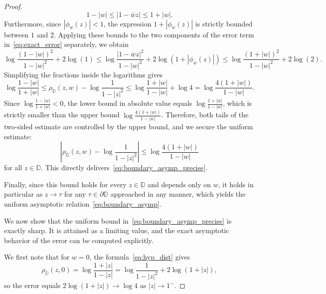 \documentclass[12pt]{amsart}
\numberwithin{equation}{section}
\theoremstyle{plain}
\theoremstyle{definition}
\begin{document}
\begin{proof}
\begin{equation*}
1-|w| \le |1-\bar w z| \le 1+|w|.
\end{equation*}
Furthermore, since $|\phi_w(z)| < 1$, the expression $1+|\phi_w(z)|$ is strictly bounded between $1$ and $2$. Applying these bounds to the two components of the error term in~\eqref{eq:exact_error} separately, we obtain
\begin{equation*}
\log\frac{(1-|w|)^2}{1-|w|^2} + 2\log(1) \le \log\frac{|1-\bar w z|^2}{1-|w|^2} + 2\log(1+|\phi_w(z)|) \le \log\frac{(1+|w|)^2}{1-|w|^2} + 2\log(2).
\end{equation*}
Simplifying the fractions inside the logarithms gives
\begin{equation*}
\log\frac{1-|w|}{1+|w|} \le \rho_{\mathbb{D}}(z,w) - \log\frac{1}{1-|z|^2} \le \log\frac{1+|w|}{1-|w|} + \log 4 = \log\frac{4(1+|w|)}{1-|w|}.
\end{equation*}
Since $\log\frac{1-|w|}{1+|w|} < 0$, the lower bound in absolute value equals $\log\frac{1+|w|}{1-|w|}$, which is strictly smaller than the upper bound $\log\frac{4(1+|w|)}{1-|w|}$. Therefore, both tails of the two-sided estimate are controlled by the upper bound, and we secure the uniform estimate:
\begin{equation*}
\left|\rho_{\mathbb{D}}(z,w) - \log\frac{1}{1-|z|^2}\right| \le \log\frac{4(1+|w|)}{1-|w|}
\end{equation*}
for all $z \in \mathbb{D}$. This directly delivers~\eqref{eq:boundary_asymp_precise}.

Finally, since this bound holds for every $z\in\mathbb{D}$ and depends only on $w$, it holds in particular as $z\to\tau$ for any $\tau\in\partial\mathbb{D}$ approached in any manner, which yields the uniform asymptotic relation~\eqref{eq:boundary_asymp}.


We now show that the uniform bound in~\eqref{eq:boundary_asymp_precise} is exactly sharp. It is attained as a limiting value, and the exact asymptotic behavior of the error can be computed explicitly.

We first note that for $w=0$, the formula~\eqref{eq:hyp_dist} gives
\begin{equation*}
\rho_{\mathbb{D}}(z,0) =\log \frac{1+|z|}{1-|z|}= \log\frac{1}{1-|z|^2} + 2\log(1+|z|),
\end{equation*}
so the error equals $2\log(1+|z|) \to \log 4$ as $|z|\to 1^-$.


\end{proof}
\end{document}
